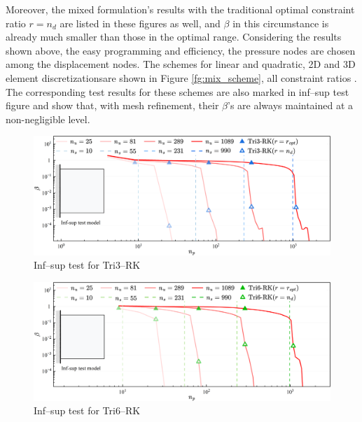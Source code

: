  Moreover, the mixed formulation's results with the traditional optimal constraint ratio $r=n_d$ are listed in these figures as well, and $\beta$ in this circumstance is already much smaller than those in the optimal range. Considering the results shown above, the easy programming and efficiency, the pressure nodes are chosen among the displacement nodes.
The  \DIFaddbegin {}\DIFaddend schemes for linear and quadratic, 2D and 3D element discretizations\DIFaddbegin {}\DIFaddend are shown in Figure \ref{fg:mix_scheme},
 \DIFaddbegin {}\DIFaddend all constraint ratios  \DIFaddbegin {}\DIFaddend .
The corresponding  \DIFaddbegin {}\DIFaddend test results for these schemes are also marked in inf--sup test figure and show that, with mesh refinement, their $\beta$'s are always maintained at a non-negligible level.

\begin{figure}[H]
\centering
\includegraphics[width=\textwidth]{png/tri3.png}
\caption{{Inf--sup test for Tri3--RK}}\label{fg:infsup_convergence_2D_a}
\end{figure}

\begin{figure}[H]
\centering
\includegraphics[width=\textwidth]{png/tri6.png}\caption{{Inf--sup test for Tri6--RK}}\label{fg:infsup_convergence_2D_b}
\end{figure}

